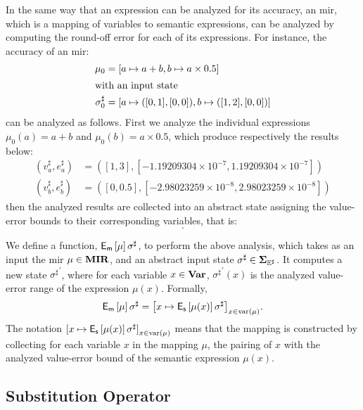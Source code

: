 In the same way that an expression can be analyzed for its accuracy, an
\gls{mir}, which is a mapping of variables to semantic expressions, can be
analyzed by computing the round-off error for each of its expressions.  For
instance, the accuracy of an \gls{mir}\@:
\begin{align}
    \mu_0 &= [a \mapsto a + b, b \mapsto a \times 0.5] \\
    \intertext{with an input state}
    \sigma^\sharp_0 &= [a \mapsto ([0, 1], [0, 0]), b \mapsto ([1, 2], [0, 0])]
\end{align}
can be analyzed as follows.  First we analyze the individual expressions
$\mu_0(a) = a + b$ and $\mu_0(b) = a \times 0.5$, which produce respectively
the results below:
\begin{align}
    (v^\sharp_a, e^\sharp_a) &= (
        [1, 3], [-1.19209304 \times 10^{-7}, 1.19209304 \times 10^{-7}]) \\
    (v^\sharp_b, e^\sharp_b) &= (
        [0, 0.5], [-2.98023259 \times 10^{-8}, 2.98023259 \times 10^{-8}])
\end{align}
then the analyzed results are collected into an abstract state assigning the
value-error bounds to their corresponding variables, that is:
\begin{equation}
    [a \mapsto (v^\sharp_a, e^\sharp_a), b \mapsto (v^\sharp_b, e^\sharp_b)].
\end{equation}

We define a function, $\operatorname{\mathsf{E}_\mathsf{m}}\left[{\mu}\right]{\sigma^\sharp}$, to perform the
above analysis, which takes as an input the \gls{mir} $\mu \in \mathbf{MIR}$, and
an abstract input state $\sigma^\sharp \in \mathbf{\Sigma}_{\mathbb{E}^\sharp}$.  It computes a new
state ${\sigma^\sharp}^\prime$, where for each variable $x \in \mathbf{Var}$,
${\sigma^\sharp}^\prime(x)$ is the analyzed value-error range of the expression
$\mu(x)$.  Formally,
\begin{equation}
    \operatorname{\mathsf{E}_\mathsf{m}}\left[{\mu}\right]{\sigma^\sharp} = {\left[
        x \mapsto \operatorname{\mathsf{E}_\mathsf{s}}\left[{\mu(x)}\right]{\sigma^\sharp}
    \right]}_{x \in \mathrm{var}\left(\mu\right)}.
    \label{po:eq:mir_accuracy}
\end{equation}
The notation ${[x \mapsto \operatorname{\mathsf{E}_\mathsf{s}}\left[{\mu(x)}\right]{\sigma^\sharp}]}_{x \in
\mathrm{var}\left(\mu\right)}$ means that the mapping is constructed by collecting for
each variable $x$ in the mapping $\mu$, the pairing of $x$ with the analyzed
value-error bound of the semantic expression $\mu(x)$.

\subsection{Substitution Operator}

